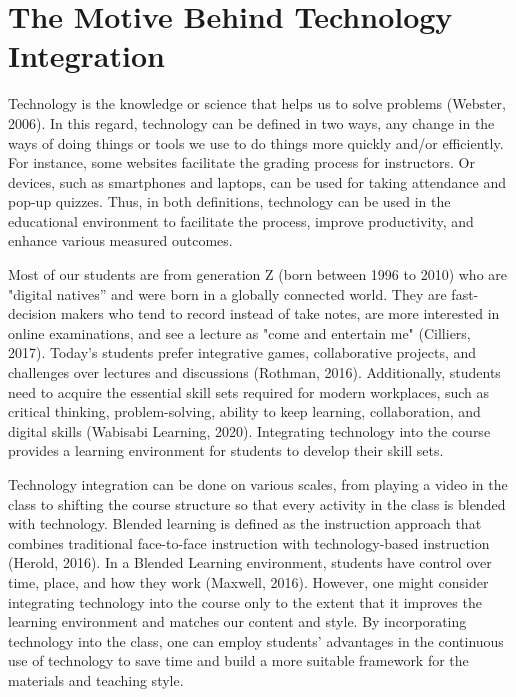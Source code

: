 \documentclass{book}
\begin{document}
\hypertarget{the-motive-behind-technology-integration}{%
\section{The Motive Behind Technology
Integration}\label{the-motive-behind-technology-integration}}

Technology is the knowledge or science that helps us to solve problems
(Webster, 2006). In this regard, technology can be defined in two ways, any
change in the ways of doing things or tools we use to do things more quickly
and/or efficiently. For instance, some websites facilitate the grading process
for instructors. Or devices, such as smartphones and laptops, can be used for
taking attendance and pop-up quizzes. Thus, in both definitions, technology
can be used in the educational environment to facilitate the process, improve
productivity, and enhance various measured outcomes.

Most of our students are from generation Z (born between 1996 to 2010) who are
"digital natives'' and were born in a globally connected world. They are
fast-decision makers who tend to record instead of take notes, are more
interested in online examinations, and see a lecture as "come and entertain
me" (Cilliers, 2017). Today's students prefer integrative games, collaborative
projects, and challenges over lectures and discussions (Rothman, 2016).
Additionally, students need to acquire the essential skill sets required for
modern workplaces, such as critical thinking, problem-solving, ability to keep
learning, collaboration, and digital skills (Wabisabi Learning, 2020).
Integrating technology into the course provides a learning environment for
students to develop their skill sets.

Technology integration can be done on various scales, from playing a video in
the class to shifting the course structure so that every activity in the class
is blended with technology. Blended learning is defined as the instruction
approach that combines traditional face-to-face instruction with
technology-based instruction (Herold, 2016). In a Blended Learning
environment, students have control over time, place, and how they work
(Maxwell, 2016). However, one might consider integrating technology into the
course only to the extent that it improves the learning environment and
matches our content and style. By incorporating technology into the class, one
can employ students' advantages in the continuous use of technology to save
time and build a more suitable framework for the materials and teaching style.
\end{document}
